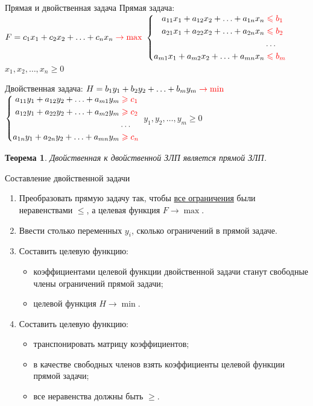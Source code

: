\documentclass[unicode,11pt,notheorems,xcolor=table]{beamer}
\newtheorem{theorem}{Теорема}
\begin{document}
\begin{frame}{Прямая и двойственная задача}{}
	\alert{Прямая задача:}
	\hfill
	$
	F=c_1x_1+c_2x_2+\ldots+c_n x_n  \color{red} \to \max
	$
	$
	\left\lbrace
	\begin{aligned}
	a_{11} x_1 + a_{12} x_2 + \ldots + a_{1n} x_n & \color{red} \leqslant b_1\\
	a_{21} x_1 + a_{22} x_2 + \ldots + a_{2n} x_n &\color{red} \leqslant b_2\\
	&\ldots\\
	a_{m1} x_1 + a_{m2} x_2 + \ldots + a_{mn} x_n &\color{red} \leqslant b_m
	\end{aligned}
	\right.
	$
	\hfill
	$x_1, x_2, \ldots, x_n \geqslant 0$
	
	\bigskip

	\alert{Двойственная задача:}
	\hfill
	$
	H=b_1y_1+b_2y_2+\ldots+b_m y_m  \color{red} \to \min
	$
	$
	\left\lbrace
	\begin{aligned}
	a_{11} y_1 + a_{12} y_2 + \ldots + a_{m1} y_m & \color{red} \geqslant c_1\\
	a_{12} y_1 + a_{22} y_2 + \ldots + a_{m2} y_m &\color{red} \geqslant c_2\\
	&\ldots\\
	a_{1n} y_1 + a_{2n} y_2 + \ldots + a_{mn} y_m &\color{red} \geqslant c_n
	\end{aligned}
	\right.
	$
	\hfill
	$y_1, y_2, \ldots, y_m \geqslant 0$
\pause
	\begin{theorem}
		Двойственная к двойственной ЗЛП является прямой ЗЛП. 
	\end{theorem}

\end{frame}




\begin{frame}{Составление двойственной задачи}{}
\begin{enumerate}
\item 
	Преобразовать прямую задачу так, чтобы \underline{все ограничения} были неравенствами $\leqslant$, а целевая функция $F \to \max$.
\item 
	Ввести столько переменных $y_i$, сколько ограничений в прямой задаче.
\item 
	Составить целевую функцию: 
	\begin{itemize}
	\item 
		коэффициентами целевой функции двойственной задачи станут свободные члены ограничений прямой задачи;
	\item 
		целевой функция $H \to \min$.
	\end{itemize}
\item 
	Составить целевую функцию: 
	\begin{itemize}
	\item 
		транспонировать матрицу коэффициентов;
	\item 	
		в качестве свободных членов взять коэффициенты целевой функции прямой задачи;
	\item 	
		все неравенства должны быть $\geqslant$.
	\end{itemize}	
\end{enumerate}
\end{frame}
\end{document}
